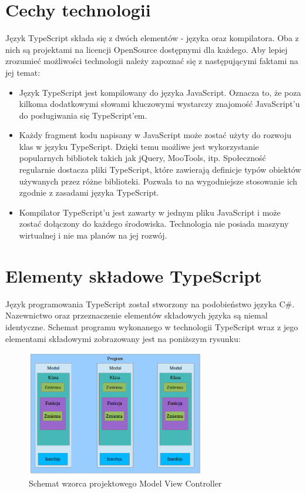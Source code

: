 \section{Cechy technologii}
Język TypeScript składa się z dwóch elementów - języka oraz kompilatora. Oba z nich są projektami na licencji OpenSource dostępnymi dla każdego. Aby lepiej zrozumieć możliwości technologii należy zapoznać się z następującymi faktami na jej temat:
\begin{itemize}
\item Język TypeScript jest kompilowany do języka JavaScript. Oznacza to, że poza kilkoma dodatkowymi słowami kluczowymi wystarczy znajomość JavaScript'u do posługiwania się TypeScript'em. 
\item Każdy fragment kodu napisany w JavaScript może zostać użyty do rozwoju klas w języku TypeScript. Dzięki temu możliwe jest wykorzystanie popularnych bibliotek takich jak jQuery, MooTools, itp. Społeczność regularnie dostacza pliki TypeScript, które zawierają definicje typów obiektów używanych przez różne biblioteki. Pozwala  to na wygodniejsze stosowanie ich zgodnie z zasadami języka TypeScript. 
\item Kompilator TypeScript'u jest zawarty w jednym pliku JavaScript i może zostać dołączony do każdego środowiska. Technologia nie posiada maszyny wirtualnej i nie ma planów na jej rozwój.
\end{itemize}

\section {Elementy składowe TypeScript}
Język programowania TypeScript został stworzony na podobieństwo języka C\#. Nazewnictwo oraz przeznaczenie elementów składowych języka są niemal identyczne.
Schemat programu wykonanego w technologii TypeScript wraz z jego elementami składowymi zobrazowany jest na poniższym rysunku:
\begin{figure}[h]
	\includegraphics[height=55mm]{./img/typescript-program.png}
	\caption{Schemat wzorca projektowego Model View Controller}
	\label{fig:mvc-scheme}
\end{figure}

